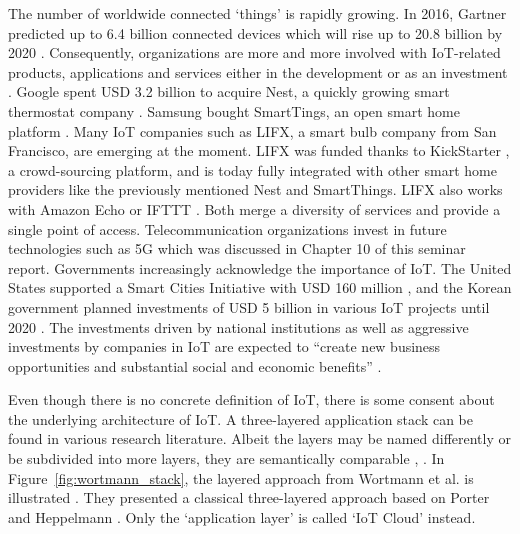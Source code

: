 	The number of worldwide connected `things' is rapidly growing. In 2016, Gartner predicted up to 6.4 billion connected devices which will rise up to 20.8 billion by 2020 \cite{gartner}. Consequently, organizations are more and more involved with IoT-related products, applications and services either in the development or as an investment \cite{ju}. Google spent USD 3.2 billion to acquire Nest, a quickly growing smart thermostat company \cite{tilley_nest}. Samsung bought SmartTings, an open smart home platform \cite{tilley_smart}. Many IoT companies such as LIFX, a smart bulb company from San Francisco, are emerging at the moment. LIFX was funded thanks to  KickStarter \cite{kickstart}, a crowd-sourcing platform, and is today fully integrated with other smart home providers like the previously mentioned Nest and SmartThings. LIFX also works with Amazon Echo \cite{echo} or IFTTT \cite{ifttt}. Both merge a diversity of services and provide a single point of access. Telecommunication organizations invest in future technologies such as 5G which was discussed in Chapter 10 of this seminar report. Governments increasingly acknowledge the importance of IoT. The United States supported a Smart Cities Initiative with USD 160 million \cite{miller}, and the Korean government planned investments of USD 5 billion in various IoT projects until 2020 \cite{cho}. The investments driven by national institutions as well as aggressive investments by companies in IoT are expected to ``create new business opportunities and substantial social and economic benefits'' \cite{ju}.

	Even though there is no concrete definition of IoT, there is some consent about the underlying architecture of IoT. A three-layered application stack can be found in various research literature. Albeit the layers may be named differently or be subdivided into more layers, they are semantically comparable \cite{fleisch} \cite{ju}, \cite{wortmann}. In Figure~\ref{fig:wortmann_stack}, the layered approach from Wortmann et al. is illustrated \cite{wortmann}. They presented a classical three-layered approach based on Porter and Heppelmann \cite{port_hepp}. Only the `application layer' is called `IoT Cloud' instead.

